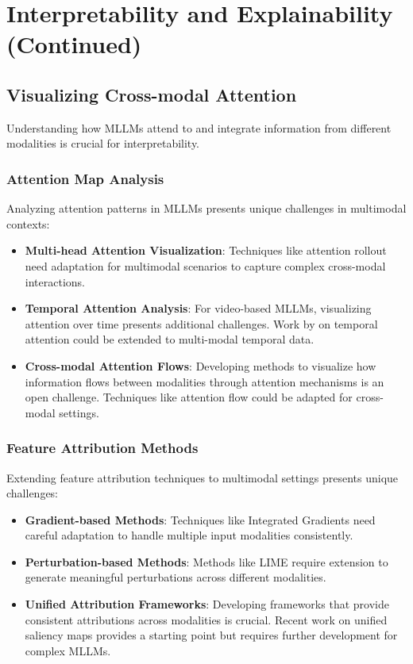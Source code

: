 \section{Interpretability and Explainability (Continued)}

\subsection{Visualizing Cross-modal Attention}
Understanding how MLLMs attend to and integrate information from different modalities is crucial for interpretability.

\subsubsection{Attention Map Analysis}
Analyzing attention patterns in MLLMs presents unique challenges in multimodal contexts:

\begin{itemize}
    \item \textbf{Multi-head Attention Visualization}: Techniques like attention rollout \citep{abnar2020quantifying} need adaptation for multimodal scenarios to capture complex cross-modal interactions.
    
    \item \textbf{Temporal Attention Analysis}: For video-based MLLMs, visualizing attention over time presents additional challenges. Work by \citet{zhou2018end} on temporal attention could be extended to multi-modal temporal data.
    
    \item \textbf{Cross-modal Attention Flows}: Developing methods to visualize how information flows between modalities through attention mechanisms is an open challenge. Techniques like attention flow \citep{abnar2020quantifying} could be adapted for cross-modal settings.
\end{itemize}

\subsubsection{Feature Attribution Methods}
Extending feature attribution techniques to multimodal settings presents unique challenges:

\begin{itemize}
    \item \textbf{Gradient-based Methods}: Techniques like Integrated Gradients \citep{sundararajan2017axiomatic} need careful adaptation to handle multiple input modalities consistently.
    
    \item \textbf{Perturbation-based Methods}: Methods like LIME \citep{ribeiro2016should} require extension to generate meaningful perturbations across different modalities.
    
    \item \textbf{Unified Attribution Frameworks}: Developing frameworks that provide consistent attributions across modalities is crucial. Recent work on unified saliency maps \citep{rebuffi2020saliency} provides a starting point but requires further development for complex MLLMs.
\end{itemize}


